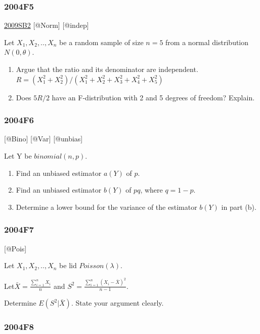\documentclass[6pt,twocolumn,Portrait]{article}
\begin{document}
\hypertarget{f5-2}{%
\subsubsection{2004F5}\label{f5-2}}

\protect\hyperlink{sb2}{2009SB2} {[}@Norm{]} {[}@indep{]}

Let \(X_1,X_2,..,X_n\) be a random sample of size \(n=5\) from a normal
distribution \(N(0,\theta)\).

\begin{enumerate}
\def\labelenumi{(\alph{enumi})}
\item
  Argue that the ratio and its denominator are independent.
  \(R=(X_1^2+ X_2^2)/(X_1^2+ X_2^2+X_3^2+ X_4^2+X_5^2)\)
\item
  Does \(5R/2\) have an F-distribution with 2 and 5 degrees of freedom?
  Explain.
\end{enumerate}

\hypertarget{f6-2}{%
\subsubsection{2004F6}\label{f6-2}}

{[}@Bino{]} {[}@Var{]} {[}@unbias{]}

Let Y be \(binomial(n,p)\).

\begin{enumerate}
\def\labelenumi{(\alph{enumi})}
\item
  Find an unbiased estimator \(a(Y)\) of \(p\).
\item
  Find an unbiased estimator \(b(Y)\) of \(pq\), where \(q=1-p\).
\item
  Determine a lower bound for the variance of the estimator \(b(Y)\) in
  part (b).
\end{enumerate}

\hypertarget{f7-2}{%
\subsubsection{2004F7}\label{f7-2}}

{[}@Pois{]}

Let \(X_1,X_2,..,X_n\) be lid \(Poisson(\lambda)\).

Let\(\bar X=\frac{\sum_{i=1}^{n}X_{i}}{n}\) and
\(S^2=\frac{\sum_{i=1}^{n}(X_{i}-\bar X)^2}{n-1}\).

Determine \(E(S^2|\bar X)\). State your argument clearly.

\hypertarget{f8-2}{%
\subsubsection{2004F8}\label{f8-2}}
\end{document}
